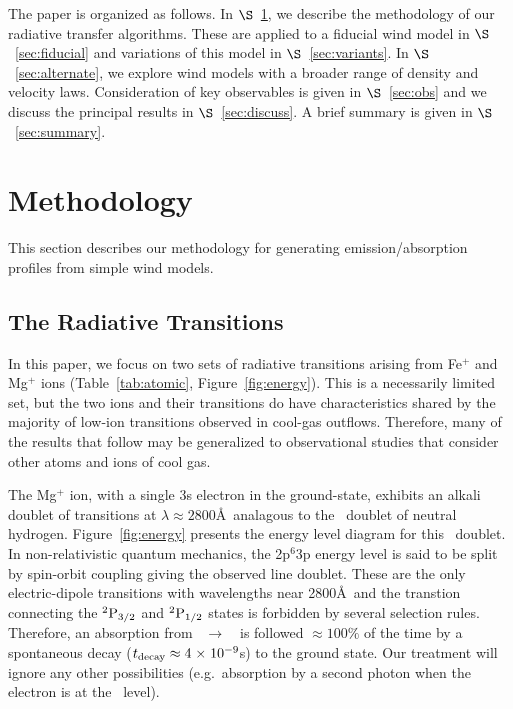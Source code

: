 \documentclass[12pt,preprint]{aastex}
\begin{document}
The paper is organized as follows.  In $\S$~\ref{sec:method}, we
describe the methodology of our radiative transfer algorithms.  These
are applied to a fiducial wind model in $\S$~\ref{sec:fiducial} and
variations of this model in $\S$~\ref{sec:variants}.  In
$\S$~\ref{sec:alternate}, we explore wind models with a broader range
of density and velocity laws.  Consideration of key observables is
given in $\S$~\ref{sec:obs} and we discuss the principal results
in $\S$~\ref{sec:discuss}.  A brief summary is given in
$\S$~\ref{sec:summary}.

\section{Methodology}
\label{sec:method}

This section describes our methodology for generating
emission/absorption profiles from simple wind models.

\subsection{The Radiative Transitions}

In this paper, we focus on two sets of radiative transitions
arising from Fe$^+$ and Mg$^+$ ions
(Table~\ref{tab:atomic}, Figure~\ref{fig:energy}).
This is a necessarily limited
set, but the two ions and their transitions do have characteristics
shared by the majority of low-ion transitions
observed in cool-gas outflows. Therefore, many
of the results that follow may be generalized to observational studies that
consider other atoms and ions of cool gas.

The Mg$^+$ ion, with a single 3s electron in the ground-state,
exhibits an alkali doublet of transitions at $\lambda \approx
2800$\AA\ analagous to the
\lya\ doublet of neutral hydrogen.  Figure~\ref{fig:energy}
presents the energy level diagram for this 
\mgiid\ doublet.  In non-relativistic quantum
mechanics, the 2p$^6$3p energy level is said to be split by spin-orbit
coupling giving the observed line doublet.  These are the only
 electric-dipole transitions 
with wavelengths near 2800\AA\ and the transtion connecting
the $\rm {}^2P_{3/2}$ and $\rm {}^2P_{1/2}$ states is forbidden by several
selection rules.  Therefore, an absorption from
\maconfig~$\to$~\mbconfig\
is followed $\approx 100\%$ of the time by a spontaneous decay
($t_{\rm decay} \approx 4{\; \times \; 10^{-9}}$s) to the
ground state. Our treatment will ignore any other possibilities
(e.g.\ absorption by a second photon when the electron is at the \mbconfig\ level).
\end{document}

